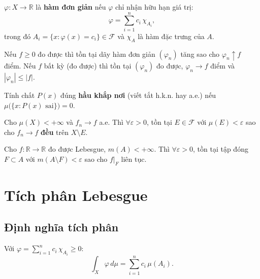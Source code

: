 \documentclass[12pt,a4paper]{article}
\begin{document}
\begin{dinhnghia}[title={Hàm đơn giản (simple function)}]
  $\varphi: X \to \mathbb{R}$ là \textbf{hàm đơn giản} nếu $\varphi$ chỉ nhận hữu hạn giá trị:
  \[
    \varphi = \sum_{i=1}^{n} c_i\, \chi_{A_i},
  \]
  trong đó $A_i = \{x : \varphi(x) = c_i\} \in \mathcal{F}$ và $\chi_A$ là hàm đặc trưng của $A$.
\end{dinhnghia}

\begin{dinhly}[title={Xấp xỉ bởi hàm đơn giản}]
  Nếu $f \ge 0$ đo được thì tồn tại dãy hàm đơn giản $(\varphi_n)$ tăng sao cho $\varphi_n \uparrow f$ điểm. Nếu $f$ bất kỳ (đo được) thì tồn tại $(\varphi_n)$ đo được, $\varphi_n \to f$ điểm và $|\varphi_n| \le |f|$.
\end{dinhly}

\begin{dinhnghia}[title={Hầu khắp nơi (almost everywhere --- a.e.)}]
  Tính chất $P(x)$ đúng \textbf{hầu khắp nơi} (viết tắt h.k.n. hay a.e.) nếu $\mu\bigl(\{x : P(x) \text{ sai}\}\bigr) = 0$.
\end{dinhnghia}

\begin{dinhly}[title={Định lý Egorov}]
  Cho $\mu(X) < +\infty$ và $f_n \to f$ a.e. Thì $\forall \varepsilon > 0$, tồn tại $E \in \mathcal{F}$ với $\mu(E) < \varepsilon$ sao cho $f_n \to f$ \textbf{đều} trên $X \setminus E$.
\end{dinhly}

\begin{dinhly}[title={Định lý Lusin}]
  Cho $f: \mathbb{R} \to \mathbb{R}$ đo được Lebesgue, $m(A) < +\infty$. Thì $\forall \varepsilon > 0$, tồn tại tập đóng $F \subset A$ với $m(A \setminus F) < \varepsilon$ sao cho $f|_F$ liên tục.
\end{dinhly}

\section{Tích phân Lebesgue}

\subsection{Định nghĩa tích phân}

\begin{dinhnghia}[title={Tích phân hàm đơn giản}]
  Với $\varphi = \sum_{i=1}^{n} c_i\, \chi_{A_i} \ge 0$:
  \[
    \int_X \varphi\,d\mu = \sum_{i=1}^{n} c_i\, \mu(A_i).
  \]
\end{dinhnghia}
\end{document}
